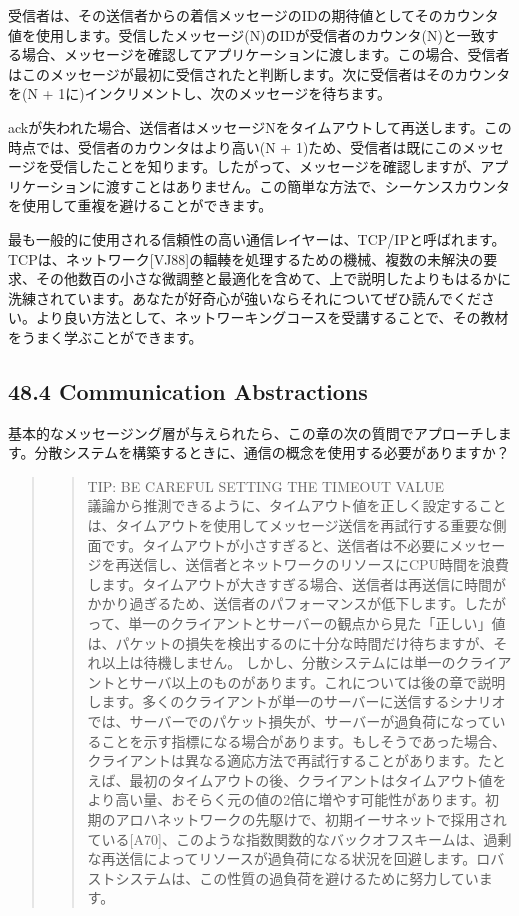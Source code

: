受信者は、その送信者からの着信メッセージのIDの期待値としてそのカウンタ値を使用します。受信したメッセージ(N)のIDが受信者のカウンタ(N)と一致する場合、メッセージを確認してアプリケーションに渡します。この場合、受信者はこのメッセージが最初に受信されたと判断します。次に受信者はそのカウンタを(N
+ 1に)インクリメントし、次のメッセージを待ちます。

ackが失われた場合、送信者はメッセージNをタイムアウトして再送します。この時点では、受信者のカウンタはより高い(N
+
1)ため、受信者は既にこのメッセージを受信したことを知ります。したがって、メッセージを確認しますが、アプリケーションに渡すことはありません。この簡単な方法で、シーケンスカウンタを使用して重複を避けることができます。

最も一般的に使用される信頼性の高い通信レイヤーは、TCP/IPと呼ばれます。TCPは、ネットワーク{[}VJ88{]}の輻輳を処理するための機械、複数の未解決の要求、その他数百の小さな微調整と最適化を含めて、上で説明したよりもはるかに洗練されています。あなたが好奇心が強いならそれについてぜひ読んでください。より良い方法として、ネットワーキングコースを受講することで、その教材をうまく学ぶことができます。

\hypertarget{communication-abstractions}{%
\subsection*{48.4 Communication
Abstractions}\label{communication-abstractions}}

基本的なメッセージング層が与えられたら、この章の次の質問でアプローチします。分散システムを構築するときに、通信の概念を使用する必要がありますか？

\begin{quote}
\begin{quote}
TIP: BE CAREFUL SETTING THE TIMEOUT VALUE\\
議論から推測できるように、タイムアウト値を正しく設定することは、タイムアウトを使用してメッセージ送信を再試行する重要な側面です。タイムアウトが小さすぎると、送信者は不必要にメッセージを再送信し、送信者とネットワークのリソースにCPU時間を浪費します。タイムアウトが大きすぎる場合、送信者は再送信に時間がかかり過ぎるため、送信者のパフォーマンスが低下します。したがって、単一のクライアントとサーバーの観点から見た「正しい」値は、パケットの損失を検出するのに十分な時間だけ待ちますが、それ以上は待機しません。
しかし、分散システムには単一のクライアントとサーバ以上のものがあります。これについては後の章で説明します。多くのクライアントが単一のサーバーに送信するシナリオでは、サーバーでのパケット損失が、サーバーが過負荷になっていることを示す指標になる場合があります。もしそうであった場合、クライアントは異なる適応方法で再試行することがあります。たとえば、最初のタイムアウトの後、クライアントはタイムアウト値をより高い量、おそらく元の値の2倍に増やす可能性があります。初期のアロハネットワークの先駆けで、初期イーサネットで採用されている{[}A70{]}、このような指数関数的なバックオフスキームは、過剰な再送信によってリソースが過負荷になる状況を回避します。ロバストシステムは、この性質の過負荷を避けるために努力しています。
\end{quote}
\end{quote}

